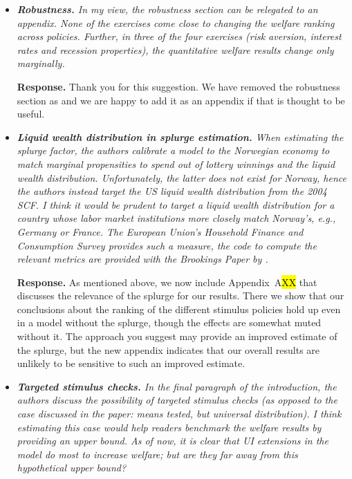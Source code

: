 \documentclass[12pt,letterpaper,english]{article}
\begin{document}
\begin{itemize}
	\item \textit{\textbf{Robustness.} In my view, the robustness section can be relegated to an appendix. None of the exercises come close to changing the welfare ranking across policies. Further, in three of the four exercises
		(risk aversion, interest rates and recession properties), the quantitative welfare results change only marginally.}
	
	\noindent \textbf{Response.} Thank you for this suggestion. We have removed the robustness section as and we are happy to add it as an appendix if that is thought to be useful.
	
	\item \textit{\textbf{Liquid wealth distribution in splurge estimation.} When estimating the splurge factor, the authors calibrate a model to the Norwegian economy to match marginal propensities to spend out of lottery winnings and the liquid wealth distribution. Unfortunately, the latter does not exist for Norway, hence the authors instead target the US liquid wealth distribution from the 2004 SCF. I think it would be prudent to target a liquid wealth distribution for a country whose labor market institutions more closely match Norway’s, e.g., Germany or France. The European Union’s Household Finance and Consumption Survey provides such a measure, the code to compute the relevant metrics are provided with the Brookings Paper by \citet{kaplan2014wealthy}.}
	
          \noindent \textbf{Response.} As mentioned above, we now include Appendix~A\hl{XX} that discusses the relevance of the splurge for our results. There we show that our conclusions about the ranking of the different stimulus policies hold up even in a model without the splurge, though the effects are somewhat muted without it. The approach you suggest may provide an improved estimate of the splurge, but the new appendix indicates that our overall results are unlikely to be sensitive to such an improved estimate.
	
	\item \textit{\textbf{Targeted stimulus checks.} In the final paragraph of the introduction, the authors discuss the possibility of targeted stimulus checks (as opposed to the case discussed in the paper: means tested, but universal distribution). I think estimating this case would help readers benchmark the welfare results by providing an upper bound. As of now, it is clear that UI extensions in the model do most to increase welfare; but are they far away from this hypothetical upper bound?}
	

\end{itemize}
\end{document}
